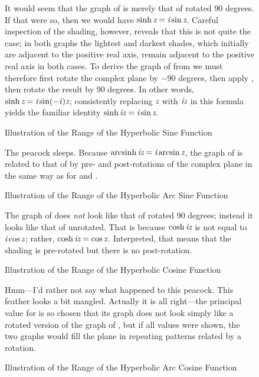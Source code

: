 \clearpage

\begin{figure}
\caption{Illustration of the Range of the Hyperbolic Sine Function}
\small\noindent
It would seem that the graph of  is merely that of 
rotated 90 degrees.  If that were so, then we would have $\sinh \emph{z} = \emph{i} \sin \emph{z}$.
Careful inspection of the shading, however, reveals that this is not quite the case;
in both graphs the lightest and darkest shades, which initially are adjacent to
the positive real axis, remain adjacent to the positive real axis in both cases.
To derive the graph of  from  we must therefore first
rotate the complex plane by $-90$ degrees, then apply , then
rotate the result by 90 degrees. In other words, $\sinh \emph{z} = \emph{i} \sin (-\emph{i\/})\emph{z}$;
consistently replacing $\emph{z}$ with $\emph{i}\emph{z}$ in this formula yields the familiar identity
$\sinh \emph{i}\emph{z} = \emph{i} \sin \emph{z}$.
\end{figure}

\clearpage

\begin{figure}
\caption{Illustration of the Range of the Hyperbolic Arc Sine Function}
\small\noindent
The peacock sleeps.  Because $\mathop\textrm{arcsinh}\nolimits \emph{i}\emph{z} = \emph{i} \arcsin \emph{z}$,
the graph of 
is related to that of  by pre- and post-rotations of the complex plane
in the same way as for  and .
\end{figure}

\clearpage

\begin{figure}
\caption{Illustration of the Range of the Hyperbolic Cosine Function}
\small\noindent
The graph of  does \emph{not} look like that of  rotated
90 degrees; instead it looks like that of  unrotated.
That is because $\cosh \emph{i}\emph{z}$ is not equal to $\emph{i} \cos \emph{z}$;
rather, $\cosh \emph{i}\emph{z} = \cos \emph{z}$.
Interpreted, that means that the shading is pre-rotated but there is no
post-rotation.
\end{figure}

\clearpage

\begin{figure}
\caption{Illustration of the Range of the Hyperbolic Arc Cosine Function}
\small\noindent
Hmm---I'd rather not say what happened to this peacock.
This feather looks a bit mangled.  Actually it is all right---the principal
value for  is so chosen that its graph does not look simply
like a rotated version of the graph of , but if all values were
shown, the two graphs would fill the plane in repeating patterns related
by a rotation.
\end{figure}

